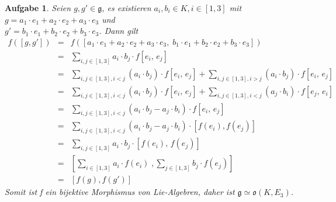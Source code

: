 \documentclass[12pt,leqno,twoside]{book}
\newcommand{\g}{\mathfrak g}
\newcommand{\barcl}{\begin{array}{rcl}}
\newcommand{\ea}{\end{array}}
\newtheorem{AG}{Aufgabe}
\begin{document}
\begin{AG}
Seien  $g,g' \in \g$, es existieren $a_i, b_i\in K, i\in[1,3]$ mit $g = a_1\cdot e_1 + a_2\cdot e_2 + a_3\cdot e_3$ und\\ $g' = b_1\cdot e_1 + b_2\cdot e_2 + b_3\cdot e_3$.
Dann gilt
\[
\barcl
f([g,g']) & = & f([a_1\cdot e_1 + a_2\cdot e_2 + a_3\cdot e_3,\;b_1\cdot e_1 + b_2\cdot e_2 + b_3\cdot e_3])\\
		  & = & \sum\limits_{i,j\in[1,3]} a_i\cdot b_j \cdot f[e_i,\,e_j]\\
		  & = & \sum\limits_{i,j\in[1,3],i<j}  (a_i\cdot b_j) \cdot f[e_i,\,e_j]+\sum\limits_{i,j\in[1,3],i>j} (a_i\cdot b_j) \cdot f[e_i,\,e_j]\\
		  & = & \sum\limits_{i,j\in[1,3],i<j}  (a_i\cdot b_j) \cdot f[e_i,\,e_j] + \sum\limits_{i,j\in[1,3],i<j} (a_j\cdot b_i) \cdot f[e_j,\,e_i]\\
		  & = & \sum\limits_{i,j\in[1,3],i<j} (a_i\cdot b_j - a_j\cdot b_i)\cdot f[e_i,\,e_j]\\
		  & = & \sum\limits_{i,j\in[1,3],i<j} (a_i\cdot b_j - a_j\cdot b_i)\cdot [f(e_i),f(e_j)]\\
		  & = & \sum\limits_{i,j\in[1,3]} a_i\cdot b_j \cdot [f(e_i),\,f(e_j)]\\
		  & = & [\sum\limits_{i\in[1,3]}a_i\cdot f(e_i) \;, \sum\limits_{j\in[1,3]}b_j\cdot f(e_j)]\\
		  & = & [f(g),f(g')]
\ea
\]
Somit ist f ein bijektive Morphismus von Lie-Algebren, daher ist $\g \simeq\mathfrak{o}(K,E_3)$.
\end{AG}
\end{document}
